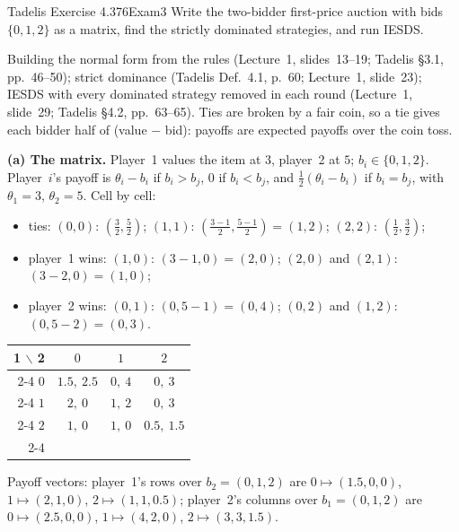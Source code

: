 \begin{exsol}{Tadelis Exercise 4.3}{76}{Exam}{3}
\asked Write the two-bidder first-price auction with bids $\{0,1,2\}$ as a matrix, find the
strictly dominated strategies, and run IESDS.

\method Building the normal form from the rules (Lecture~1, slides~13--19; Tadelis \S3.1,
pp.~46--50); strict dominance (Tadelis Def.~4.1, p.~60; Lecture~1, slide~23); IESDS with every
dominated strategy removed in each round (Lecture~1, slide~29; Tadelis \S4.2, pp.~63--65). Ties are
broken by a fair coin, so a tie gives each bidder half of (value $-$ bid): payoffs are expected
payoffs over the coin toss.

\solution
\textbf{(a) The matrix.} Player~1 values the item at $3$, player~2 at $5$; $b_i \in \{0,1,2\}$.
Player~$i$'s payoff is $\theta_i - b_i$ if $b_i > b_j$, $0$ if $b_i < b_j$, and
$\tfrac12(\theta_i - b_i)$ if $b_i = b_j$, with $\theta_1 = 3$, $\theta_2 = 5$. Cell by cell:
\begin{itemize}
  \item ties: $(0,0)$: $(\tfrac32, \tfrac52)$; $(1,1)$: $(\tfrac{3-1}{2}, \tfrac{5-1}{2}) = (1, 2)$;
  $(2,2)$: $(\tfrac12, \tfrac32)$;
  \item player~1 wins: $(1,0)$: $(3-1, 0) = (2,0)$; $(2,0)$ and $(2,1)$: $(3-2, 0) = (1, 0)$;
  \item player~2 wins: $(0,1)$: $(0, 5-1) = (0,4)$; $(0,2)$ and $(1,2)$: $(0, 5-2) = (0, 3)$.
\end{itemize}
\begin{center}
\begin{tabular}{r|c|c|c|}
\multicolumn{1}{r}{1 $\backslash$ 2} & \multicolumn{1}{c}{$0$} & \multicolumn{1}{c}{$1$} & \multicolumn{1}{c}{$2$}\\ \cline{2-4}
$0$ & $1.5,\ 2.5$ & $0,\ 4$ & $0,\ 3$ \\ \cline{2-4}
$1$ & $2,\ 0$ & $1,\ 2$ & $0,\ 3$ \\ \cline{2-4}
$2$ & $1,\ 0$ & $1,\ 0$ & $0.5,\ 1.5$ \\ \cline{2-4}
\end{tabular}
\end{center}
Payoff vectors: player~1's rows over $b_2 = (0,1,2)$ are $0 \mapsto (1.5, 0, 0)$,
$1 \mapsto (2, 1, 0)$, $2 \mapsto (1, 1, 0.5)$; player~2's columns over $b_1 = (0,1,2)$ are
$0 \mapsto (2.5, 0, 0)$, $1 \mapsto (4, 2, 0)$, $2 \mapsto (3, 3, 1.5)$.


\end{exsol}
